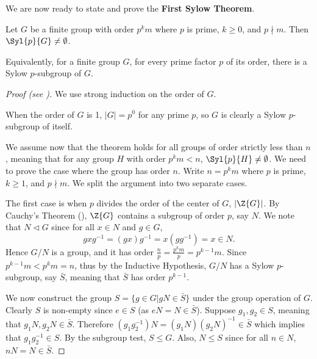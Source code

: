 We are now ready to state and prove the \textbf{First Sylow Theorem}.
\begin{theorem}[Sylow I]\label{thrm-sylow-1}
    Let $G$ be a finite group with order $p^k m$ where $p$ is prime, $k \geq 0$, and $p \nmid m$. Then $\Syl{p}{G} \neq \emptyset$.
\end{theorem}
\begin{remark}
    Equivalently, for a finite group $G$, for every prime factor $p$ of its order, there is a Sylow $p$-subgroup of $G$.
\end{remark}
\begin{proof}[Proof (see {\cite[pp.~1--3]{mann_2011}})]
    We use strong induction on the order of $G$.

    When the order of $G$ is 1, $|G| = p^0$ for any prime $p$, so $G$ is clearly a Sylow $p$-subgroup of itself.

    We assume now that the theorem holds for all groups of order strictly less than $n$, meaning that for any group $H$ with order $p^k m < n$, $\Syl{p}{H} \neq \emptyset$. We need to prove the case where the group has order $n$. Write $n = p^k m$ where $p$ is prime, $k \geq 1$, and $p \nmid m$. We split the argument into two separate cases.

    The first case is when $p$ divides the order of the center of $G$, $|\Z{G}|$. By Cauchy's Theorem (), $\Z{G}$ contains a subgroup of order $p$, say $N$. We note that $N \lhd G$ since for all $x \in N$ and $g \in G$,
    \[
        gxg^{-1} = (gx)g^{-1} = x(gg^{-1}) = x \in N.
    \]
    Hence $G/N$ is a group, and it has order $\frac np = \frac{p^km}{p} = p^{k-1}m$. Since $p^{k-1}m < p^km = n$, thus by the Inductive Hypothesis, $G/N$ has a Sylow $p$-subgroup, say $\bar{S}$, meaning that $\bar{S}$ has order $p^{k-1}$.

    We now construct the group $S = \{g \in G \vert gN \in \bar{S}\}$ under the group operation of $G$. Clearly $S$ is non-empty since $e \in S$ (as $eN = N \in \bar{S}$). Suppose $g_1, g_2 \in S$, meaning that $g_1N, g_2N \in \bar{S}$. Therefore $(g_1g_2^{-1})N = (g_1N)(g_2N)^{-1} \in \bar{S}$ which implies that $g_1g_2^{-1} \in S$. By the subgroup test, $S \leq G$. Also, $N \leq S$ since for all $n \in N$, $nN = N \in \bar{S}$.


\end{proof}
